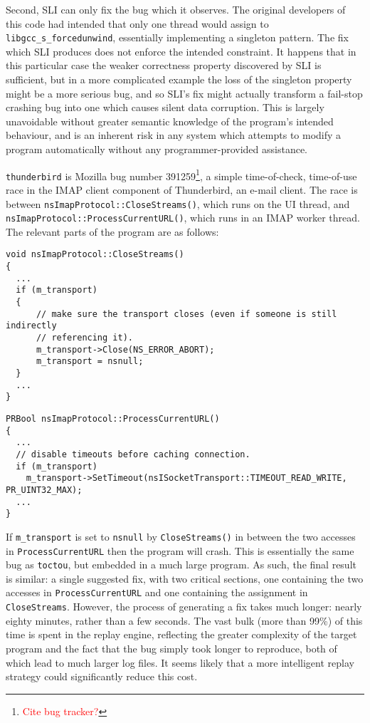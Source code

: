 \documentclass[10pt,twocolumn,preprint,natbib,authoryear]{sigplanconf}
\newcommand{\editorial}[1]{\textcolor{red}{\footnote{\textcolor{red}{#1}}}}
\begin{document}
Second, SLI can only fix the bug which it observes.  The original
developers of this code had intended that only one thread would assign
to \verb|libgcc_s_forcedunwind|, essentially implementing a singleton
pattern.  The fix which SLI produces does not enforce the intended
constraint.  It happens that in this particular case the weaker
correctness property discovered by SLI is sufficient, but in a more
complicated example the loss of the singleton property might be a more
serious bug, and so SLI's fix might actually transform a fail-stop
crashing bug into one which causes silent data corruption.  This is
largely unavoidable without greater semantic knowledge of the
program's intended behaviour, and is an inherent risk in any system
which attempts to modify a program automatically without any
programmer-provided assistance.

\verb|thunderbird| is Mozilla bug number 391259\editorial{Cite bug
  tracker?}, a simple time-of-check, time-of-use race in the IMAP
client component of Thunderbird, an e-mail client.  The race is
between \verb|nsImapProtocol::CloseStreams()|, which runs on the UI
thread, and \verb|nsImapProtocol::ProcessCurrentURL()|, which runs in
an IMAP worker thread.  The relevant parts of the program are as
follows:

\begin{verbatim}
void nsImapProtocol::CloseStreams()
{
  ...
  if (m_transport)
  {
      // make sure the transport closes (even if someone is still indirectly
      // referencing it).
      m_transport->Close(NS_ERROR_ABORT);
      m_transport = nsnull;
  }
  ...
}
\end{verbatim}

\begin{verbatim}
PRBool nsImapProtocol::ProcessCurrentURL()
{
  ...
  // disable timeouts before caching connection.
  if (m_transport)
    m_transport->SetTimeout(nsISocketTransport::TIMEOUT_READ_WRITE, PR_UINT32_MAX);
  ...
}
\end{verbatim}

If \verb|m_transport| is set to \verb|nsnull| by \verb|CloseStreams()|
in between the two accesses in \verb|ProcessCurrentURL| then the
program will crash.  This is essentially the same bug as
\verb|toctou|, but embedded in a much large program.  As such, the
final result is similar: a single suggested fix, with two critical
sections, one containing the two accesses in \verb|ProcessCurrentURL|
and one containing the assignment in \verb|CloseStreams|.  However,
the process of generating a fix takes much longer: nearly eighty
minutes, rather than a few seconds.  The vast bulk (more than 99\%) of
this time is spent in the replay engine, reflecting the greater
complexity of the target program and the fact that the bug simply took
longer to reproduce, both of which lead to much larger log files.  It
seems likely that a more intelligent replay strategy could
significantly reduce this cost.
\end{document}

